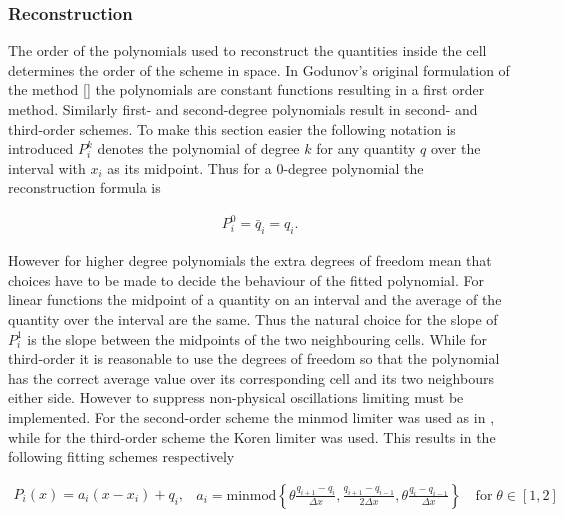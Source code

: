 \documentclass[SingleSpace,12pt]{Serre_ASCE}
\begin{document}
\subsubsection{Reconstruction} %
The order of the polynomials used to reconstruct the quantities inside the cell determines the order of the scheme in space. In Godunov's original formulation of the method [] the polynomials are constant functions resulting in a first order method. Similarly first- and second-degree polynomials result in second- and third-order schemes. To make this section easier the following notation is introduced $P^k_i$ denotes the polynomial of degree $k$ for any quantity $q$ over the interval with $x_i$ as its midpoint. Thus for a 0-degree polynomial the reconstruction formula is
\begin{linenomath*}
\begin{gather} \label{eq:recon0}
P^0_i = \bar{q}_i = q_i.
\end{gather}
\end{linenomath*}
However for higher degree polynomials the extra degrees of freedom mean that choices have to be made to decide the behaviour of the fitted polynomial. For linear functions the midpoint of a quantity on an interval and the average of the quantity over the interval are the same. Thus the natural choice for the slope of $P^1_i$ is the slope between the midpoints of the two neighbouring cells. While for third-order it is reasonable to use the degrees of freedom so that the polynomial has the correct average value over its corresponding cell and its two neighbours either side. However to suppress non-physical oscillations limiting must be implemented. For the second-order scheme the minmod limiter was used as in \cite{Kurganov-etal-2001-707}, while for the third-order scheme the Koren limiter was used\cite{Koren-1993}. This results in the following fitting schemes respectively
\begin{linenomath*}
\begin{subequations}\label{eq:recon1}
\begin{gather}\label{eq:recon11}
P_i(x) = a_i\left(x - x_i\right) + q_i,
\end{gather}
\begin{gather}\label{eq:recon12}
a_i = \text{minmod}\left\lbrace\theta \frac{q_{i+1} - q_{i}}{\Delta x}, \frac{q_{i+1} - q_{i-1}}{2\Delta x} ,\theta \frac{q_{i} - q_{i-1}}{\Delta x}\right\rbrace \quad \text{for} \; \theta \in \left[1,2\right]
\end{gather}
\end{subequations}
\end{linenomath*}
\end{document}

